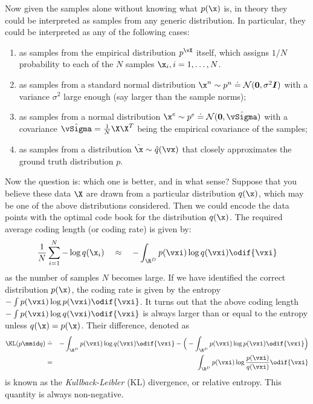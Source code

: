 \documentclass[../../book-main.tex]{subfiles}
\begin{document}
Now given the samples alone without knowing what $p(\x)$ is, in theory they could be interpreted as samples from any generic distribution. In particular, they could be interpreted as any of the following cases:
\begin{enumerate}
	\item as samples from the empirical distribution $p^{\vX}$ itself, which assigns $1/N$ probability to each of the $N$ samples $\x_i, i=1, \ldots, N$.
	\item as samples from a standard normal distribution $\x^n \sim p^{n} \doteq \mathcal{N}(\boldsymbol{0}, \sigma^2 \boldsymbol{I})$ with a variance $\sigma^2$ large enough (say larger than the sample norms);
	\item as samples from a normal distribution $\x^e \sim p^{e} \doteq \mathcal{N}(\boldsymbol{0}, \hat{\vSigma})$ with a covariance $\hat{\vSigma} = \frac{1}{N} \X \X^T$ being the empirical covariance of the samples;
	\item as samples from a distribution $\hat \x \sim \hat{q}(\vx)$ that closely approximates the ground truth  distribution $p$.
\end{enumerate}
Now the question is: which one is better, and in what sense? Suppose that you believe these data $\X$ are drawn from a particular distribution  $q(\x)$, which may be one of the above distributions considered. Then we could encode the data points with the optimal code book for the distribution $q(\x)$. The required average coding length (or coding rate) is given by:
\begin{equation}
	\frac{1}{N}\sum_{i=1}^N -\log q(\x_i) \quad \approx \quad - \int_{\R^{D}} p(\vxi) \log q(\vxi)\odif{\vxi}
\end{equation}
as the number of samples $N$ becomes large. If we have identified the correct distribution $p(\x)$, the coding rate is given by the entropy $- \int p(\vxi) \log p(\vxi) \odif{\vxi}$. It turns out that the above coding length $- \int p(\vxi) \log q(\vxi) \odif{\vxi}$ is always larger than or equal to the entropy unless $q(\x) = p(\x)$. Their difference, denoted as
\begin{eqnarray}
	\KL(p \mmid q) &\doteq& - \int_{\R^{D}} p(\vxi) \log q(\vxi) \odif{\vxi}  - \Big(- \int_{\R^{D}} p(\vxi) \log p(\vxi) \odif{\vxi} \Big)\\
	&=& \int_{\R^{D}} p(\vxi) \log \frac{p(\vxi)}{q(\vxi)} \odif{\vxi}
\end{eqnarray}
is known as the {\em Kullback-Leibler} (KL) divergence, or relative entropy. This quantity is always non-negative.
\end{document}
